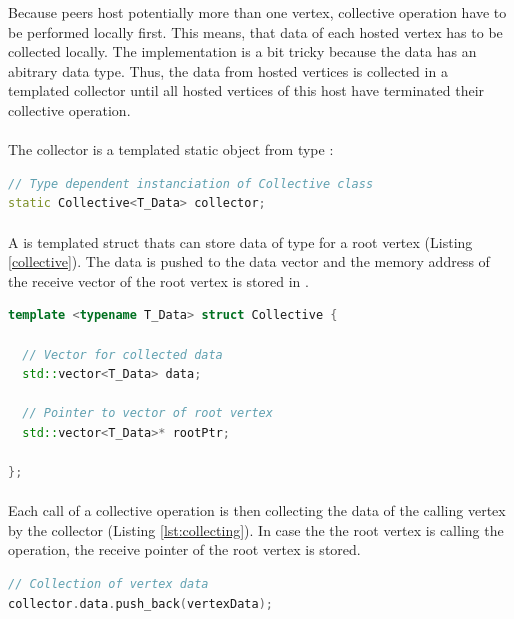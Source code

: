 Because peers host potentially more than one vertex, collective
operation have to be performed locally first. This means, that data of
each hosted vertex has to be collected locally.  The implementation is
a bit tricky because the data has an abitrary data type. Thus, the
data from hosted vertices is collected in a templated collector until
all hosted vertices of this host have terminated their collective
operation.

\paragraph*{}
The collector is a templated static object from type :
\begin{lstlisting}[language=C++, label=lst:static_collective]
// Type dependent instanciation of Collective class
static Collective<T_Data> collector;
\end{lstlisting}

\paragraph*{}
A  is templated struct thats can store data of type
 for a root vertex (Listing \ref{collective}). The data is
pushed to the data vector and the memory address of the receive vector
of the root vertex is stored in .
\begin{lstlisting}[language=C++, label=lst:collective]
template <typename T_Data> struct Collective { 

  // Vector for collected data
  std::vector<T_Data> data; 

  // Pointer to vector of root vertex
  std::vector<T_Data>* rootPtr; 

};
\end{lstlisting}

\paragraph*{}
Each call of a collective operation is then collecting the data of the
calling vertex by the collector (Listing \ref{lst:collecting}).  In
case the the root vertex is calling the operation, the receive pointer
of the root vertex is stored.
\begin{lstlisting}[language=C++, label=lst:collecting]
// Collection of vertex data
collector.data.push_back(vertexData);
\end{lstlisting}


